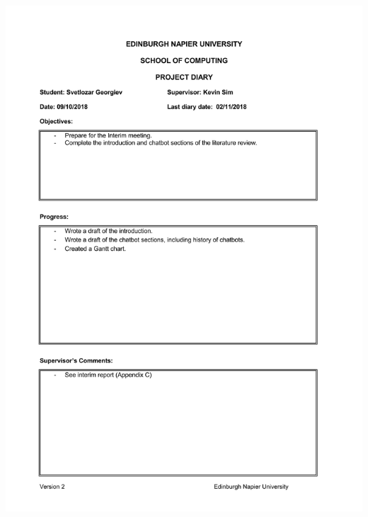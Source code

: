 \documentclass[12pt,a4paper]{article}
\begin{document}
\begin{appendices}
\includegraphics[width=\textwidth,height=\textheight,keepaspectratio]{week9.jpg}


\end{appendices}
\end{document}
